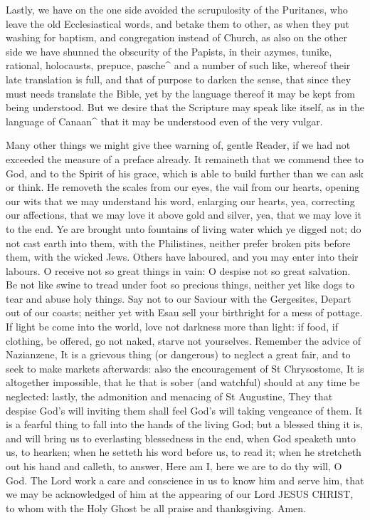 Lastly, we have on the one side avoided the scrupulosity of the Puritanes, who leave the old Ecclesiastical words, and betake them to other, as when they put washing for baptism, and congregation instead of Church, as also on the other side we have shunned the obscurity of the Papists, in their azymes, tunike, rational, holocausts, prepuce, pasche^ and a number of such like, whereof their late translation is full, and that of purpose to darken the sense, that since they must needs translate the Bible, yet by the language thereof it may be kept from being understood. But we desire that the Scripture may speak like itself, as in the language of Canaan^ that it may be understood even of the very vulgar.

Many other things we might give thee warning of, gentle Reader, if we had not exceeded the measure of a preface already. It remaineth that we commend thee to God, and to the Spirit of his grace, which is able to build further than we can ask or think. He removeth the scales from our eyes, the vail from our hearts, opening our wits that we may understand his word, enlarging our hearts, yea, correcting our affections, that we may love it above gold and silver, yea, that we may love it to the end. Ye are brought unto fountains of living water which ye digged not; do not cast earth into them, with the Philistines, neither prefer broken pits before them, with the wicked Jews. Others have laboured, and you may enter into their labours. O receive not so great things in vain: O despise not so great salvation. Be not like swine to tread under foot so precious things, neither yet like dogs to tear and abuse holy things. Say not to our Saviour with the Gergesites, Depart out of our coasts; neither yet with Esau sell your birthright for a mess of pottage. If light be come into the world, love not darkness more than light: if food, if clothing, be offered, go not naked, starve not yourselves. Remember the advice of Nazianzene, It is a grievous thing (or dangerous) to neglect a great fair, and to seek to make markets afterwards: also the encouragement of St Chrysostome, It is altogether impossible, that he that is sober (and watchful) should at any time be neglected: lastly, the admonition and menacing of St Augustine, They that despise God's will inviting them shall feel God's will taking vengeance of them. It is a fearful thing to fall into the hands of the living God; but a blessed thing it is, and will bring us to everlasting blessedness in the end, when God speaketh unto us, to hearken; when he setteth his word before us, to read it; when he stretcheth out his hand and calleth, to answer, Here am I, here we are to do thy will, O God. The Lord work a care and conscience in us to know him and serve him, that we may be acknowledged of him at the appearing of our Lord JESUS CHRIST, to whom with the Holy Ghost be all praise and thanksgiving. Amen.